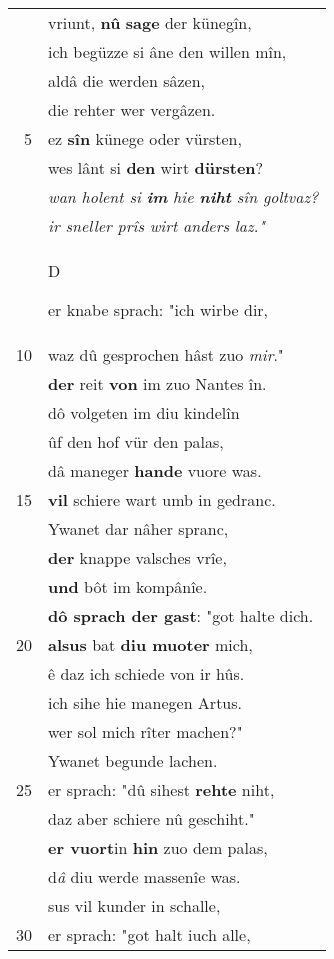 \documentclass[8pt,a4paper,notitlepage]{article}
\begin{document}
\begin{table}[ht]
\begin{minipage}[t]{0.5\linewidth}
\begin{tabular}{rl}
 & vriunt, \textbf{nû} \textbf{sage} der künegîn,\\ 
 & ich begüzze si âne den willen mîn,\\ 
 & aldâ die werden sâzen,\\ 
 & die rehter wer vergâzen.\\ 
5 & ez \textbf{sîn} künege oder vürsten,\\ 
 & wes lânt si \textbf{den} wirt \textbf{dürsten}?\\ 
 & \textit{wan holent si \textbf{im} hie \textbf{niht} sîn goltvaz?}\\ 
 & \textit{ir sneller prîs wirt anders laz."}\\ 
 & \begin{large}D\end{large}er knabe sprach: "ich wirbe dir,\\ 
10 & waz dû gesprochen hâst zuo \textit{mir}."\\ 
 & \textbf{der} reit \textbf{von} im zuo Nantes în.\\ 
 & dô volgeten im diu kindelîn\\ 
 & ûf den hof vür den palas,\\ 
 & dâ maneger \textbf{hande} vuore was.\\ 
15 & \textbf{vil} schiere wart umb in gedranc.\\ 
 & Ywanet dar nâher spranc,\\ 
 & \textbf{der} knappe valsches vrîe,\\ 
 & \textbf{und} bôt im kompânîe.\\ 
 & \textbf{dô sprach der gast}: "got halte dich.\\ 
20 & \textbf{alsus} bat \textbf{diu muoter} mich,\\ 
 & ê daz ich schiede von ir hûs.\\ 
 & ich sihe hie manegen Artus.\\ 
 & wer sol mich rîter machen?"\\ 
 & Ywanet begunde lachen.\\ 
25 & er sprach: "dû sihest \textbf{rehte} niht,\\ 
 & daz aber schiere nû geschiht."\\ 
 & \textbf{er vuort}in \textbf{hin} zuo dem palas,\\ 
 & d\textit{â} diu werde massenîe was.\\ 
 & sus vil kunder in schalle,\\ 
30 & er sprach: "got halt iuch alle,\\ 

\end{tabular}
\end{minipage}
\end{table}
\end{document}
